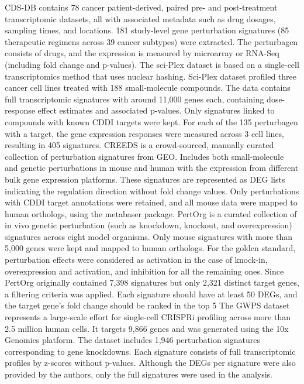 CDS-DB contains 78 cancer patient-derived, paired pre- and post-treatment transcriptomic datasets, all with associated metadata such as drug dosages, sampling times, and locations. 181 study-level gene perturbation signatures (85 therapeutic regimens across 39 cancer subtypes) were extracted. The perturbagen consists of drugs, and the expression is measured by microarray or RNA-Seq (including fold change and p-values). 
The sci-Plex dataset is based on a single-cell transcriptomics method that uses nuclear hashing. Sci-Plex dataset profiled three cancer cell lines treated with 188 small-molecule compounds. The data contains full transcriptomic signatures with around 11,000 genes each, containing dose-response effect estimates and associated p-values. Only signatures linked to compounds with known CDDI targets were kept. For each of the 135 perturbagen with a target, the gene expression responses were measured across 3 cell lines, resulting in 405 signatures. 
CREEDS is a crowd-sourced, manually curated collection of perturbation signatures from GEO. Includes both small-molecule and genetic perturbations in mouse and human with the expression from different bulk gene expression platforms. These signatures are represented as DEG lists indicating the regulation direction without fold change values. Only perturbations with CDDI target annotations were retained, and all mouse data were mapped to human orthologs, using the metabaser package.
PertOrg is a curated collection of in vivo genetic perturbation (such as knockdown, knockout, and overexpression) signatures across eight model organisms. Only mouse signatures with more than 5,000 genes were kept and mapped to human orthologs. For the golden standard, perturbation effects were considered as activation in the case  of knock-in, overexpression and activation, and inhibition for all the remaining ones. Since PertOrg originally contained 7,398 signatures but only 2,321 distinct target genes, a filtering criteria was applied. Each signature should have at least 50 DEGs, and the target gene's fold change should be ranked in the top 5%
The GWPS dataset represents a large-scale effort for single-cell CRISPRi profiling across more than 2.5 million human cells. It targets 9,866 genes and was generated using the 10x Genomics platform. The dataset includes 1,946 perturbation signatures corresponding to gene knockdowns. Each signature consists of full transcriptomic profiles by z-scores without p-values. Although the DEGs per signature were also provided by the authors, only the full signatures were used in the analysis.


